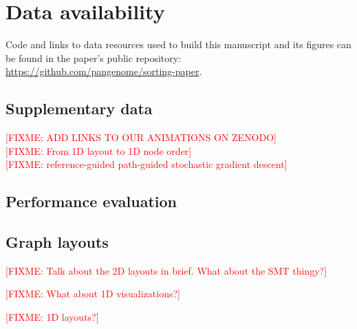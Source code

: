 \documentclass{bioinfo}
\theoremstyle{definition}
\newcommand{\red}[1]{{\textcolor{Red}{#1}}}
\newcommand{\FIXME}[1]{\red{[FIXME: #1]}}
\begin{document}
	\section*{Data availability}
	
	Code and links to data resources used to build this manuscript and its figures can be found in the paper's public repository: \url{https://github.com/pangenome/sorting-paper}.
		
	
	
	
	
	\begin{appendices}
	    \section{Supplementary data}
		\FIXME{ADD LINKS TO OUR ANIMATIONS ON ZENODO} \\
	    \FIXME{From 1D layout to 1D node order} \\
	    \FIXME{reference-guided path-guided stochastic gradient descent}
	    \subsection{Performance evaluation}
	    \label{sec:performance}
	    
		\subsection{Graph layouts}
		\label{sec:layouts}
		\FIXME{Talk about the 2D layouts in brief. What about the SMT thingy?}
		
		\FIXME{What about 1D visualizations?}
		
		
		
		\FIXME{1D layouts?}
	\end{appendices}
\end{document}
